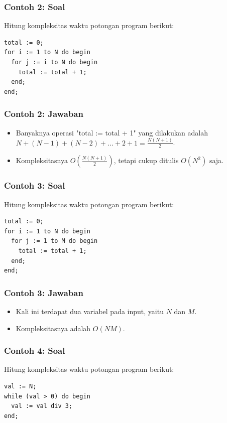 \documentclass{beamer}
\begin{document}
\begin{frame}[fragile]
\frametitle{Contoh 2: Soal}
Hitung kompleksitas waktu potongan program berikut:

\hfill

\begin{lstlisting}
total := 0;
for i := 1 to N do begin
  for j := i to N do begin
    total := total + 1;
  end;
end;
\end{lstlisting}
\end{frame}

\begin{frame}
\frametitle{Contoh 2: Jawaban}
\begin{itemize}
	\item Banyaknya operasi "total := total + 1" yang dilakukan adalah $N + (N-1) + (N-2) + ... + 2 + 1 = \frac{N(N+1)}{2}$.
	\item Kompleksitasnya $O \left( \frac{N(N+1)}{2} \right)$, tetapi cukup ditulis $O(N^2)$ saja.
\end{itemize}
\end{frame}

\begin{frame}[fragile]
\frametitle{Contoh 3: Soal}
Hitung kompleksitas waktu potongan program berikut:

\hfill

\begin{lstlisting}
total := 0;
for i := 1 to N do begin
  for j := 1 to M do begin
    total := total + 1;
  end;
end;
\end{lstlisting}
\end{frame}

\begin{frame}
\frametitle{Contoh 3: Jawaban}
\begin{itemize}
	\item Kali ini terdapat dua variabel pada input, yaitu $N$ dan $M$.
	\item Kompleksitasnya adalah $O(NM)$.
\end{itemize}
\end{frame}

\begin{frame}[fragile]
\frametitle{Contoh 4: Soal}
Hitung kompleksitas waktu potongan program berikut:

\hfill

\begin{lstlisting}
val := N;
while (val > 0) do begin
  val := val div 3;
end;
\end{lstlisting}
\end{frame}
\end{document}
